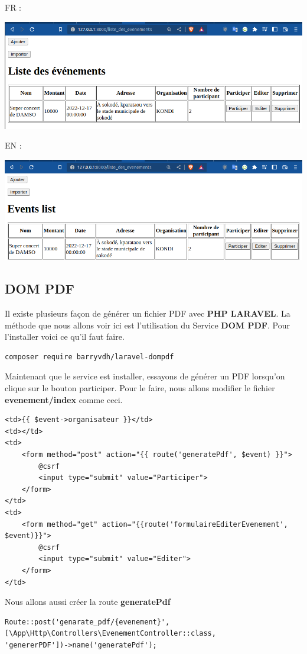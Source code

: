 \documentclass[12pt,a4paper]{article}
\begin{document}
FR :
\begin{center}
\includegraphics[scale=0.5]{img/fr.png}
\end{center}
EN :
\begin{center}
\includegraphics[scale=0.5]{img/en.png}
\end{center}

\subsection{DOM PDF}
Il existe plusieurs façon de générer un fichier PDF avec \textbf{PHP LARAVEL}. La méthode que nous allons voir ici est l'utilisation du Service \textbf{DOM PDF}.
Pour l'installer voici ce qu'il faut faire.

\begin{verbatim}
composer require barryvdh/laravel-dompdf
\end{verbatim}

Maintenant que le service est installer, essayons de générer un PDF lorsqu'on clique sur le bouton
participer. Pour le faire, nous allons modifier le fichier \textbf{evenement/index} comme ceci.
\begin{verbatim}
<td>{{ $event->organisateur }}</td>
<td></td>
<td>
	<form method="post" action="{{ route('generatePdf', $event) }}">
		@csrf
		<input type="submit" value="Participer">
	</form>
</td>
<td>
	<form method="get" action="{{route('formulaireEditerEvenement', $event)}}">
		@csrf
		<input type="submit" value="Editer">
	</form>
</td>
\end{verbatim}

Nous allons aussi créer la route \textbf{generatePdf} 
\begin{verbatim}
Route::post('genarate_pdf/{evenement}', [\App\Http\Controllers\EvenementController::class,
'genererPDF'])->name('generatePdf');
\end{verbatim}
\end{document}
